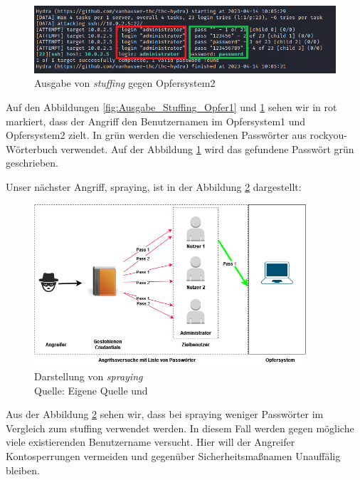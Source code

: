 \begin{figure}[H]
   \centering
   \includegraphics[width=1\textwidth]{assets/stuffing_kali2.png}
   \caption[Ausgabe von \textit{\gls{stuffing}} gegen Opfersystem2]
   {Ausgabe von \textit{\gls{stuffing}} gegen Opfersystem2}
   \label{fig:Ausgabe_Stuffing_Opfer2}
   \centering
\end{figure}

Auf den Abbildungen \ref{fig:Ausgabe_Stuffing_Opfer1} und \ref{fig:Ausgabe_Stuffing_Opfer2} sehen wir in rot markiert, dass der Angriff den Benutzernamen  im Opfersystem1 und  Opfersystem2 zielt. In grün werden die verschiedenen Passwörter aus \gls{rockyou}-Wörterbuch verwendet. Auf der Abbildung \ref{fig:Ausgabe_Stuffing_Opfer2} wird das gefundene Passwört grün geschrieben. 

Unser nächster Angriff, \gls{spraying}, ist in der Abbildung \ref{fig:spraying} dargestellt:
\begin{figure}[H]
   \centering
   \includegraphics[width=0.9\textwidth]{assets/Spraying.jpg}
   \caption[Darstellung von \textit{\gls{spraying}}]
   {Darstellung von \textit{\gls{spraying}}\\Quelle: Eigene Quelle und \citep{Swathi_spraxy}}
   \label{fig:spraying}
   \centering
\end{figure}

Aus der Abbildung \ref{fig:spraying} sehen wir, dass bei \gls{spraying} weniger Passwörter im Vergleich zum \gls{stuffing} verwendet werden. In diesem Fall werden gegen mögliche viele existierenden Benutzername versucht. Hier will der Angreifer  Kontosperrungen vermeiden und gegenüber Sicherheitsmaßnamen Unauffälig bleiben. 

